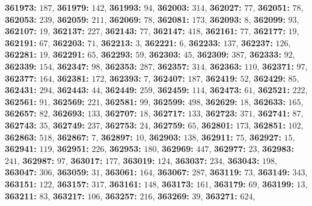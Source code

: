 \textsf{\bfseries 361973:} $187$, \textsf{\bfseries 361979:} $142$, \textsf{\bfseries 361993:} $94$, \textsf{\bfseries 362003:} $314$, \textsf{\bfseries 362027:} $77$, \textsf{\bfseries 362051:} $78$, \textsf{\bfseries 362053:} $239$, \textsf{\bfseries 362059:} $211$, \textsf{\bfseries 362069:} $78$, \textsf{\bfseries 362081:} $173$, \textsf{\bfseries 362093:} $8$, \textsf{\bfseries 362099:} $93$, \textsf{\bfseries 362107:} $19$, \textsf{\bfseries 362137:} $227$, \textsf{\bfseries 362143:} $77$, \textsf{\bfseries 362147:} $418$, \textsf{\bfseries 362161:} $77$, \textsf{\bfseries 362177:} $19$, \textsf{\bfseries 362191:} $67$, \textsf{\bfseries 362203:} $71$, \textsf{\bfseries 362213:} $3$, \textsf{\bfseries 362221:} $6$, \textsf{\bfseries 362233:} $137$, \textsf{\bfseries 362237:} $126$, \textsf{\bfseries 362281:} $19$, \textsf{\bfseries 362291:} $65$, \textsf{\bfseries 362293:} $59$, \textsf{\bfseries 362303:} $45$, \textsf{\bfseries 362309:} $387$, \textsf{\bfseries 362333:} $92$, \textsf{\bfseries 362339:} $154$, \textsf{\bfseries 362347:} $98$, \textsf{\bfseries 362353:} $287$, \textsf{\bfseries 362357:} $314$, \textsf{\bfseries 362363:} $110$, \textsf{\bfseries 362371:} $97$, \textsf{\bfseries 362377:} $164$, \textsf{\bfseries 362381:} $172$, \textsf{\bfseries 362393:} $7$, \textsf{\bfseries 362407:} $187$, \textsf{\bfseries 362419:} $52$, \textsf{\bfseries 362429:} $85$, \textsf{\bfseries 362431:} $294$, \textsf{\bfseries 362443:} $44$, \textsf{\bfseries 362449:} $259$, \textsf{\bfseries 362459:} $114$, \textsf{\bfseries 362473:} $61$, \textsf{\bfseries 362521:} $222$, \textsf{\bfseries 362561:} $91$, \textsf{\bfseries 362569:} $221$, \textsf{\bfseries 362581:} $99$, \textsf{\bfseries 362599:} $498$, \textsf{\bfseries 362629:} $18$, \textsf{\bfseries 362633:} $165$, \textsf{\bfseries 362657:} $82$, \textsf{\bfseries 362693:} $133$, \textsf{\bfseries 362707:} $18$, \textsf{\bfseries 362717:} $133$, \textsf{\bfseries 362723:} $371$, \textsf{\bfseries 362741:} $87$, \textsf{\bfseries 362743:} $35$, \textsf{\bfseries 362749:} $237$, \textsf{\bfseries 362753:} $24$, \textsf{\bfseries 362759:} $65$, \textsf{\bfseries 362801:} $173$, \textsf{\bfseries 362851:} $102$, \textsf{\bfseries 362863:} $518$, \textsf{\bfseries 362867:} $7$, \textsf{\bfseries 362897:} $10$, \textsf{\bfseries 362903:} $138$, \textsf{\bfseries 362911:} $75$, \textsf{\bfseries 362927:} $15$, \textsf{\bfseries 362941:} $119$, \textsf{\bfseries 362951:} $226$, \textsf{\bfseries 362953:} $180$, \textsf{\bfseries 362969:} $447$, \textsf{\bfseries 362977:} $23$, \textsf{\bfseries 362983:} $241$, \textsf{\bfseries 362987:} $97$, \textsf{\bfseries 363017:} $177$, \textsf{\bfseries 363019:} $124$, \textsf{\bfseries 363037:} $234$, \textsf{\bfseries 363043:} $198$, \textsf{\bfseries 363047:} $306$, \textsf{\bfseries 363059:} $31$, \textsf{\bfseries 363061:} $164$, \textsf{\bfseries 363067:} $287$, \textsf{\bfseries 363119:} $73$, \textsf{\bfseries 363149:} $343$, \textsf{\bfseries 363151:} $122$, \textsf{\bfseries 363157:} $317$, \textsf{\bfseries 363161:} $148$, \textsf{\bfseries 363173:} $161$, \textsf{\bfseries 363179:} $69$, \textsf{\bfseries 363199:} $13$, \textsf{\bfseries 363211:} $83$, \textsf{\bfseries 363217:} $106$, \textsf{\bfseries 363257:} $216$, \textsf{\bfseries 363269:} $39$, \textsf{\bfseries 363271:} $624$, 
